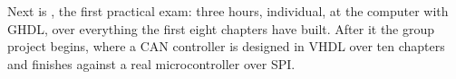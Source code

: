 Next is , the first practical exam: three hours, individual, at the computer with
GHDL, over everything the first eight chapters have built. After it the group project begins, where
a CAN controller is designed in VHDL over ten chapters and finishes against a real microcontroller
over SPI.
